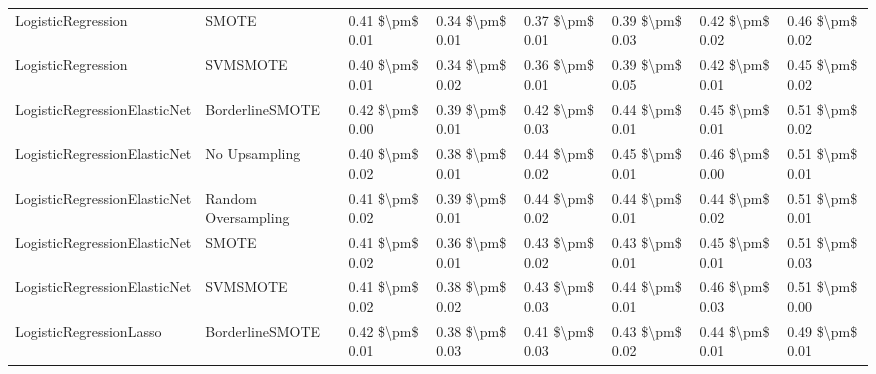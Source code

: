 \begin{tabular}{llllllll}
             LogisticRegression &                         SMOTE & 0.41 \$\textbackslash pm\$ 0.01 &           0.34 \$\textbackslash pm\$ 0.01 &       0.37 \$\textbackslash pm\$ 0.01 &        0.39 \$\textbackslash pm\$ 0.03 &                         0.42 \$\textbackslash pm\$ 0.02 &     0.46 \$\textbackslash pm\$ 0.02 \\
             LogisticRegression &                      SVMSMOTE & 0.40 \$\textbackslash pm\$ 0.01 &           0.34 \$\textbackslash pm\$ 0.02 &       0.36 \$\textbackslash pm\$ 0.01 &        0.39 \$\textbackslash pm\$ 0.05 &                         0.42 \$\textbackslash pm\$ 0.01 &     0.45 \$\textbackslash pm\$ 0.02 \\
   LogisticRegressionElasticNet &               BorderlineSMOTE & 0.42 \$\textbackslash pm\$ 0.00 &           0.39 \$\textbackslash pm\$ 0.01 &       0.42 \$\textbackslash pm\$ 0.03 &        0.44 \$\textbackslash pm\$ 0.01 &                         0.45 \$\textbackslash pm\$ 0.01 &     0.51 \$\textbackslash pm\$ 0.02 \\
   LogisticRegressionElasticNet &                 No Upsampling & 0.40 \$\textbackslash pm\$ 0.02 &           0.38 \$\textbackslash pm\$ 0.01 &       0.44 \$\textbackslash pm\$ 0.02 &        0.45 \$\textbackslash pm\$ 0.01 &                         0.46 \$\textbackslash pm\$ 0.00 &     0.51 \$\textbackslash pm\$ 0.01 \\
   LogisticRegressionElasticNet &           Random Oversampling & 0.41 \$\textbackslash pm\$ 0.02 &           0.39 \$\textbackslash pm\$ 0.01 &       0.44 \$\textbackslash pm\$ 0.02 &        0.44 \$\textbackslash pm\$ 0.01 &                         0.44 \$\textbackslash pm\$ 0.02 &     0.51 \$\textbackslash pm\$ 0.01 \\
   LogisticRegressionElasticNet &                         SMOTE & 0.41 \$\textbackslash pm\$ 0.02 &           0.36 \$\textbackslash pm\$ 0.01 &       0.43 \$\textbackslash pm\$ 0.02 &        0.43 \$\textbackslash pm\$ 0.01 &                         0.45 \$\textbackslash pm\$ 0.01 &     0.51 \$\textbackslash pm\$ 0.03 \\
   LogisticRegressionElasticNet &                      SVMSMOTE & 0.41 \$\textbackslash pm\$ 0.02 &           0.38 \$\textbackslash pm\$ 0.02 &       0.43 \$\textbackslash pm\$ 0.03 &        0.44 \$\textbackslash pm\$ 0.01 &                         0.46 \$\textbackslash pm\$ 0.03 &     0.51 \$\textbackslash pm\$ 0.00 \\
        LogisticRegressionLasso &               BorderlineSMOTE & 0.42 \$\textbackslash pm\$ 0.01 &           0.38 \$\textbackslash pm\$ 0.03 &       0.41 \$\textbackslash pm\$ 0.03 &        0.43 \$\textbackslash pm\$ 0.02 &                         0.44 \$\textbackslash pm\$ 0.01 &     0.49 \$\textbackslash pm\$ 0.01 \\

\end{tabular}

